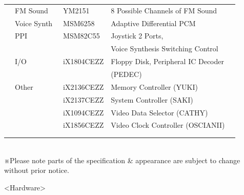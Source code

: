 ﻿\documentclass[twoside,a4paper,12pt]{article}
\begin{document}
\begin{tabular}{|p{13mm}|p{25mm}|p{22mm}|p{73mm}|p{30mm}|}
& FM Sound & \ YM2151 & 8 Possible Channels of FM Sound &\\
& Voice Synth & \ MSM6258 & Adaptive Differential PCM &\\
& PPI & \ MSM82C55 & Joystick 2 Ports, &\\
& & & Voice Synthesis Switching Control &\\
& I/O & \ iX1804CEZZ & Floppy Disk, Peripheral IC Decoder &\\
& & & (PEDEC) &\\
& Other & \ iX2136CEZZ & Memory Controller (YUKI) &\\
& & \ iX2137CEZZ & System Controller (SAKI) &\\
& & \ iX1094CEZZ & Video Data Selector (CATHY) &\\
& & \ iX1856CEZZ & Video Clock Controller (OSCIANII) &\\
& & & &\\
& & & &\\
\hline
\end{tabular}\\

※Please note parts of the specification \& appearance are subject to change without prior notice.

\newpage

<Hardware>
\end{document}
